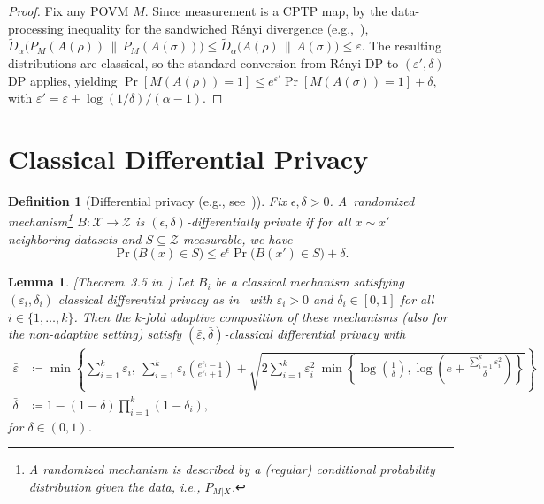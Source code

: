 \documentclass[11pt]{article}
\theoremstyle{plain}
\newtheorem{lemma}[theo]{Lemma}
\newtheorem{definition}[theo]{Definition}
\theoremstyle{remark}
\begin{document}
\begin{proof}
Fix any POVM $M$. Since measurement is a CPTP map, by the data-processing inequality for the
sandwiched R\'enyi divergence (e.g.,~\citep{Beigi13}), \\
$
\widetilde D_\alpha\!\big(P_M(A(\rho))\,\|\,P_M(A(\sigma))\big)
\le
\widetilde D_\alpha\!\big(A(\rho)\,\|\,A(\sigma)\big)
\le
\varepsilon.
$
The resulting distributions are classical, so the standard conversion from R\'enyi DP to
$(\varepsilon',\delta)$-DP applies, yielding
$
\Pr[M(A(\rho))=1]
\le
e^{\varepsilon'}\Pr[M(A(\sigma))=1]+\delta,
$
with $\varepsilon'=\varepsilon+\log(1/\delta)/(\alpha-1)$.
\end{proof}

\section{Classical Differential Privacy}

\begin{definition}[Differential privacy (e.g., see~\citep{DworkMNS06,DworkKMMN06})] \label{def: DP}
Fix $\epsilon,\delta>0$. A~randomized mechanism\footnote{A randomized mechanism is described by a (regular) conditional probability distribution given the data, i.e., $P_{M|X}$.} ${B}: \mathcal{X} \to \mathcal{Z}$ is $(\epsilon,\delta)$-differentially private if for all $x \sim x'$ neighboring datasets and $S \subseteq \mathcal{Z} $ measurable, we have 
\begin{equation}
\Pr\big(B(x) \in S \big) \leq e^{\epsilon} \Pr \big(B(x') \in S \big) + \delta.\label{eq:dp_def}
\end{equation}
\end{definition}


\begin{lemma}\label{lem:Theorem_Classical_advanced_Comp}[Theorem~3.5 in~\citep{KairouzOhVi17}]
Let $B_i$ be a classical mechanism satisfying $(\varepsilon_i, \delta_i)$ classical differential privacy as in~ with $\varepsilon_i >0$ and $\delta_i \in [0,1]$ for all $i \in \{1,\ldots, k\}$. Then the $k$-fold adaptive composition of these mechanisms (also for the non-adaptive setting) satisfy $(\bar{\varepsilon}, \bar{\delta})$-classical differential privacy with 
\begin{align}
    \bar{\varepsilon} & \coloneqq  \min \left\{ \sum_{i=1}^k \varepsilon_i , \  \sum_{i=1}^k \varepsilon_i \left( \frac{e^{\varepsilon_i}-1}{e^{\varepsilon_i} +1} \right) + \sqrt{2  \sum_{i=1}^k {\varepsilon_i^2} \ \min\left\{\log\!\left( \frac{1}{\delta} \right), \log\!\left(e+ \frac{ \sum_{i=1}^k \varepsilon_i^2 }{\delta} \right)  \right\}} \right \} \\ 
    \bar{\delta} & \coloneqq 1- (1-\delta) \prod_{i=1}^k (1-\delta_i),
\end{align}
for $\delta \in (0,1)$.
\end{lemma}
\end{document}
